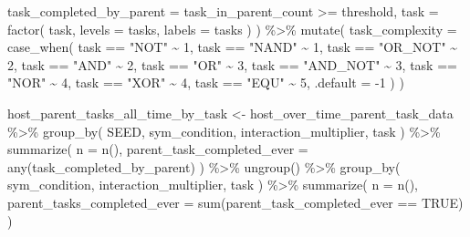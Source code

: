 \documentclass[
]{book}
\newenvironment{Shaded}{\begin{snugshade}}{\end{snugshade}}
\newcommand{\AttributeTok}[1]{\textcolor[rgb]{0.77,0.63,0.00}{#1}}
\newcommand{\ConstantTok}[1]{\textcolor[rgb]{0.00,0.00,0.00}{#1}}
\newcommand{\DecValTok}[1]{\textcolor[rgb]{0.00,0.00,0.81}{#1}}
\newcommand{\FunctionTok}[1]{\textcolor[rgb]{0.00,0.00,0.00}{#1}}
\newcommand{\NormalTok}[1]{#1}
\newcommand{\OtherTok}[1]{\textcolor[rgb]{0.56,0.35,0.01}{#1}}
\newcommand{\SpecialCharTok}[1]{\textcolor[rgb]{0.00,0.00,0.00}{#1}}
\newcommand{\StringTok}[1]{\textcolor[rgb]{0.31,0.60,0.02}{#1}}
\begin{document}
\begin{Shaded}
\begin{Highlighting}[]
    \AttributeTok{task\_completed\_by\_parent =}\NormalTok{ task\_in\_parent\_count }\SpecialCharTok{\textgreater{}=}\NormalTok{ threshold,}
    \AttributeTok{task =} \FunctionTok{factor}\NormalTok{(}
\NormalTok{      task,}
      \AttributeTok{levels =}\NormalTok{ tasks,}
      \AttributeTok{labels =}\NormalTok{ tasks}
\NormalTok{    )}
\NormalTok{  ) }\SpecialCharTok{\%\textgreater{}\%}
  \FunctionTok{mutate}\NormalTok{(}
    \AttributeTok{task\_complexity =} \FunctionTok{case\_when}\NormalTok{(}
\NormalTok{      task }\SpecialCharTok{==} \StringTok{"NOT"} \SpecialCharTok{\textasciitilde{}} \DecValTok{1}\NormalTok{,}
\NormalTok{      task }\SpecialCharTok{==} \StringTok{"NAND"} \SpecialCharTok{\textasciitilde{}} \DecValTok{1}\NormalTok{,}
\NormalTok{      task }\SpecialCharTok{==} \StringTok{"OR\_NOT"} \SpecialCharTok{\textasciitilde{}} \DecValTok{2}\NormalTok{,}
\NormalTok{      task }\SpecialCharTok{==} \StringTok{"AND"} \SpecialCharTok{\textasciitilde{}} \DecValTok{2}\NormalTok{,}
\NormalTok{      task }\SpecialCharTok{==} \StringTok{"OR"} \SpecialCharTok{\textasciitilde{}} \DecValTok{3}\NormalTok{,}
\NormalTok{      task }\SpecialCharTok{==} \StringTok{"AND\_NOT"} \SpecialCharTok{\textasciitilde{}} \DecValTok{3}\NormalTok{,}
\NormalTok{      task }\SpecialCharTok{==} \StringTok{"NOR"} \SpecialCharTok{\textasciitilde{}} \DecValTok{4}\NormalTok{,}
\NormalTok{      task }\SpecialCharTok{==} \StringTok{"XOR"} \SpecialCharTok{\textasciitilde{}} \DecValTok{4}\NormalTok{,}
\NormalTok{      task }\SpecialCharTok{==} \StringTok{"EQU"} \SpecialCharTok{\textasciitilde{}} \DecValTok{5}\NormalTok{,}
      \AttributeTok{.default =} \SpecialCharTok{{-}}\DecValTok{1}
\NormalTok{    )}
\NormalTok{  )}

\NormalTok{host\_parent\_tasks\_all\_time\_by\_task }\OtherTok{\textless{}{-}}\NormalTok{ host\_over\_time\_parent\_task\_data }\SpecialCharTok{\%\textgreater{}\%}
  \FunctionTok{group\_by}\NormalTok{(}
\NormalTok{    SEED,}
\NormalTok{    sym\_condition,}
\NormalTok{    interaction\_multiplier,}
\NormalTok{    task}
\NormalTok{  ) }\SpecialCharTok{\%\textgreater{}\%}
  \FunctionTok{summarize}\NormalTok{(}
    \AttributeTok{n =} \FunctionTok{n}\NormalTok{(),}
    \AttributeTok{parent\_task\_completed\_ever =} \FunctionTok{any}\NormalTok{(task\_completed\_by\_parent)}
\NormalTok{  ) }\SpecialCharTok{\%\textgreater{}\%}
  \FunctionTok{ungroup}\NormalTok{() }\SpecialCharTok{\%\textgreater{}\%}
  \FunctionTok{group\_by}\NormalTok{(}
\NormalTok{    sym\_condition,}
\NormalTok{    interaction\_multiplier,}
\NormalTok{    task}
\NormalTok{  ) }\SpecialCharTok{\%\textgreater{}\%}
  \FunctionTok{summarize}\NormalTok{(}
    \AttributeTok{n =} \FunctionTok{n}\NormalTok{(),}
    \AttributeTok{parent\_tasks\_completed\_ever =} \FunctionTok{sum}\NormalTok{(parent\_task\_completed\_ever }\SpecialCharTok{==} \ConstantTok{TRUE}\NormalTok{)}
\NormalTok{  )}
\end{Highlighting}
\end{Shaded}
\end{document}
